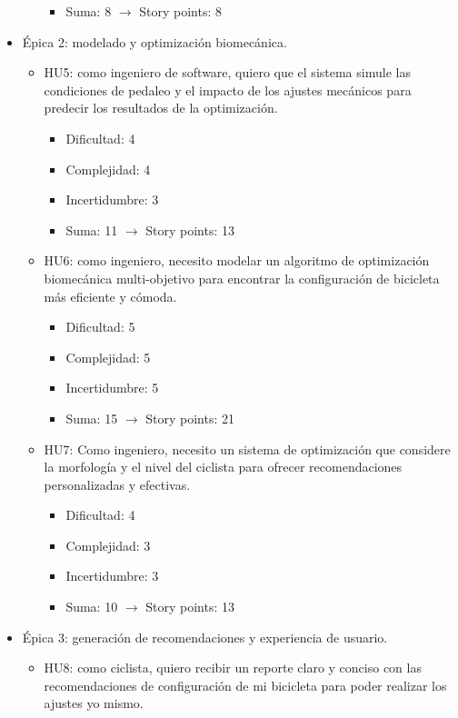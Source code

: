 \documentclass[
11pt, %
]{charter}
\begin{document}
\begin{itemize}
\begin{itemize}
\begin{itemize}
          \item Suma: 8 $\rightarrow$ Story points: 8
        \end{itemize}
    \end{itemize}
  \item Épica 2: modelado y optimización biomecánica.
    \begin{itemize}
      \item HU5: como ingeniero de software, quiero que el sistema simule las condiciones de pedaleo y el impacto de los ajustes mecánicos para predecir los resultados de la optimización.
        \begin{itemize}
          \item Dificultad: 4
          \item Complejidad: 4
          \item Incertidumbre: 3
          \item Suma: 11 $\rightarrow$ Story points: 13
        \end{itemize}
      \item HU6: como ingeniero, necesito modelar un algoritmo de optimización biomecánica multi-objetivo para encontrar la configuración de bicicleta más eficiente y cómoda.
        \begin{itemize}
          \item Dificultad: 5
          \item Complejidad: 5
          \item Incertidumbre: 5
          \item Suma: 15 $\rightarrow$ Story points: 21
        \end{itemize}
      \item HU7: Como ingeniero, necesito un sistema de optimización que considere la morfología y el nivel del ciclista para ofrecer recomendaciones personalizadas y efectivas.
        \begin{itemize}
          \item Dificultad: 4
          \item Complejidad: 3
          \item Incertidumbre: 3
          \item Suma: 10 $\rightarrow$ Story points: 13
        \end{itemize}
    \end{itemize}
  \item Épica 3: generación de recomendaciones y experiencia de usuario.
    \begin{itemize}
      \item HU8: como ciclista, quiero recibir un reporte claro y conciso con las recomendaciones de configuración de mi bicicleta para poder realizar los ajustes yo mismo.

\end{itemize}
\end{itemize}
\end{document}
